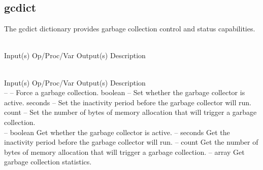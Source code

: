 \subsection{gcdict}
\label{sec:gcdict}

The gcdict dictionary provides garbage collection control and status
capabilities.

\begin{longtable}{}
\caption{gcdict summary}
\\
\hline
\optableent
	{Input(s)}
	{Op/Proc/Var}
	{Output(s)}
	{Description}
\hline \hline
\endfirsthead
\caption[]{\emph{continued}} \\
\hline
\optableent
	{Input(s)}
	{Op/Proc/Var}
	{Output(s)}
	{Description}
\hline \hline \endhead
{} \endfoot
\hline \endlastfoot
 \\
\hline \hline
\optableent
	{--}
	{{\bf {}}}
	{--}
	{Force a garbage collection.}
\hline
\optableent
	{boolean}
	{{\bf {}}}
	{--}
	{Set whether the garbage collector is active.}
\hline
\optableent
	{seconds}
	{{\bf {}}}
	{--}
	{Set the inactivity period before the garbage collector will run.}
\hline
\optableent
	{count}
	{{\bf {}}}
	{--}
	{Set the number of bytes of memory allocation that will trigger a garbage collection.}
\hline \hline
{} \\
\hline \hline
\optableent
	{--}
	{{\bf {}}}
	{boolean}
	{Get whether the garbage collector is active.}
\hline
\optableent
	{--}
	{{\bf {}}}
	{seconds}
	{Get the inactivity period before the garbage collector will run.}
\hline
\optableent
	{--}
	{{\bf {}}}
	{count}
	{Get the number of bytes of memory allocation that will trigger a garbage collection.}
\hline
\optableent
	{--}
	{{\bf {}}}
	{array}
	{Get garbage collection statistics.}
\end{longtable}

